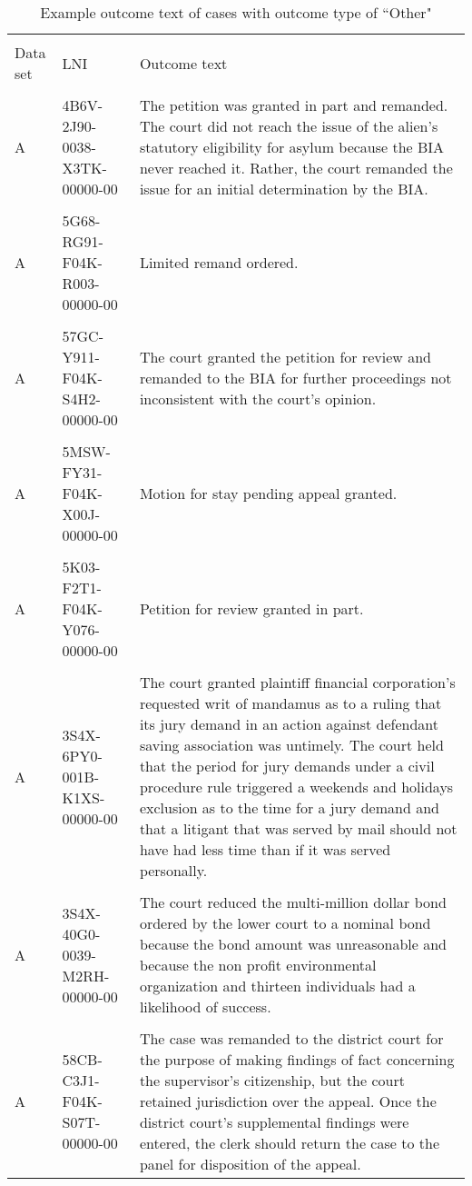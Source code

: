 \documentclass[10pt, letterpaper]{article}
\begin{document}
\begin{spacing}{1.0}
\begin{small}
\begin{longtable}[H]{llp{4in}}
    \caption{Example outcome text of cases with outcome type of ``Other"}\\
    \hline\\[-6pt]
    Data set & LNI & Outcome text\\[2pt]
    \hline\\[-6pt]
    \endhead
    A & 4B6V-2J90-0038-X3TK-00000-00 & The petition was granted in part and remanded. The court did not reach the issue of the alien's statutory eligibility for asylum because the BIA never reached it. Rather, the court remanded the issue for an initial determination by the BIA.\\
    & &\\[-4pt]
    A & 5G68-RG91-F04K-R003-00000-00 & Limited remand ordered.\\
    & &\\[-4pt]
    A & 57GC-Y911-F04K-S4H2-00000-00 & The court granted the petition for review and remanded to the BIA for further proceedings not inconsistent with the court's opinion.\\
    & &\\[-4pt]
    A & 5MSW-FY31-F04K-X00J-00000-00 & Motion for stay pending appeal granted.\\
    & &\\[-4pt]
    A & 5K03-F2T1-F04K-Y076-00000-00 & Petition for review granted in part.\\
    & &\\[-4pt]
    A & 3S4X-6PY0-001B-K1XS-00000-00 & The court granted plaintiff financial corporation's requested writ of mandamus as to a ruling that its jury demand in an action against defendant saving association was untimely. The court held that the period for jury demands under a civil procedure rule triggered a weekends and holidays exclusion as to the time for a jury demand and that a litigant that was served by mail should not have had less time than if it was served personally.\\
    & &\\[-4pt]
    A & 3S4X-40G0-0039-M2RH-00000-00 & The court reduced the multi-million dollar bond ordered by the lower court to a nominal bond because the bond amount was unreasonable and because the non profit environmental organization and thirteen individuals had a likelihood of success.\\
    & &\\[-4pt]
    A & 58CB-C3J1-F04K-S07T-00000-00 & The case was remanded to the district court for the purpose of making findings of fact concerning the supervisor's citizenship, but the court retained jurisdiction over the appeal. Once the district court's supplemental findings were entered, the clerk should return the case to the panel for disposition of the appeal.\\

\end{longtable}
\end{small}
\end{spacing}
\end{document}
